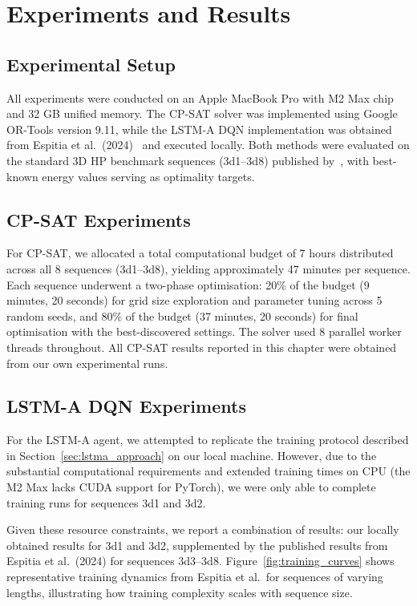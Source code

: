 \documentclass{article}
\theoremstyle{plain}
\theoremstyle{definition}
\begin{document}
\section{Experiments and Results}\label{sec:results}

\subsection{Experimental Setup}

All experiments were conducted on an Apple MacBook Pro with M2 Max chip and 32 GB unified memory. The CP-SAT solver was implemented using Google OR-Tools version 9.11, while the LSTM-A DQN implementation was obtained from Espitia et al.~(2024)~\cite{Espitia2024} and executed locally. Both methods were evaluated on the standard 3D HP benchmark sequences (3d1--3d8) published by~\cite{Espitia2024}, with best-known energy values serving as optimality targets.

\subsection{CP-SAT Experiments}

For CP-SAT, we allocated a total computational budget of 7 hours distributed across all 8 sequences (3d1--3d8), yielding approximately 47 minutes per sequence. Each sequence underwent a two-phase optimisation: 20\% of the budget (9 minutes, 20 seconds) for grid size exploration and parameter tuning across 5 random seeds, and 80\% of the budget (37 minutes, 20 seconds) for final optimisation with the best-discovered settings. The solver used 8 parallel worker threads throughout. All CP-SAT results reported in this chapter were obtained from our own experimental runs.

\subsection{LSTM-A DQN Experiments}

For the LSTM-A agent, we attempted to replicate the training protocol described in Section~\ref{sec:lstma_approach} on our local machine. However, due to the substantial computational requirements and extended training times on CPU (the M2 Max lacks CUDA support for PyTorch), we were only able to complete training runs for sequences 3d1 and 3d2. 

Given these resource constraints, we report a combination of results: our locally obtained results for 3d1 and 3d2, supplemented by the published results from Espitia et al.\ (2024) for sequences 3d3--3d8. Figure~\ref{fig:training_curves} shows representative training dynamics from Espitia et al.\ for sequences of varying lengths, illustrating how training complexity scales with sequence size.
\end{document}
